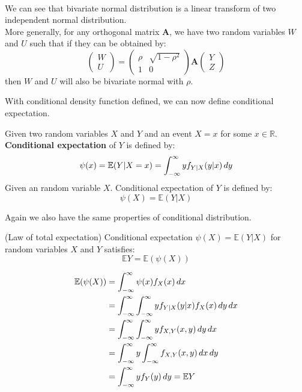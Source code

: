 \documentclass{huhtakm-template-book}
\newcommand{\expect}{\mathbb{E}}
\begin{document}
\begin{eg}
\begin{align*}
        \end{align*}
        We can see that bivariate normal distribution is a linear transform of two independent normal distribution.\\
        More generally, for any orthogonal matrix $\mathbf{A}$, we have two random variables $W$ and $U$ such that if they can be obtained by:
        \begin{equation*}
            \begin{pmatrix}
                W\\
                U
            \end{pmatrix}=\begin{pmatrix}
                \rho & \sqrt{1-\rho^{2}}\\
                1 & 0
            \end{pmatrix}\mathbf{A}\begin{pmatrix}
                Y\\
                Z
            \end{pmatrix}
        \end{equation*}
        then $W$ and $U$ will also be bivariate normal with $\rho$.
    \end{eg}
    With conditional density function defined, we can now define conditional expectation.
    \begin{defn}
        Given two random variables $X$ and $Y$ and an event $X=x$ for some $x\in\mathbb{R}$. \textbf{Conditional expectation} of $Y$ is defined by:
        \begin{equation*}
            \psi(x)=\expect(Y|X=x)=\intinfty yf_{Y|X}(y|x)\,dy
        \end{equation*}
        Given an random variable $X$. Conditional expectation of $Y$ is defined by:
        \begin{equation*}
            \psi(X)=\expect(Y|X)
        \end{equation*}
    \end{defn}
    Again we also have the same properties of conditional distribution.
    \begin{lem}(Law of total expectation) 
        Conditional expectation $\psi(X)=\expect(Y|X)$ for random variables $X$ and $Y$ satisfies:
        \begin{equation*}
            \expect Y=\expect(\psi(X))
        \end{equation*}
    \end{lem}
    \begin{proofing}
        \begin{align*}
            \expect(\psi(X))&=\intinfty\psi(x)f_{X}(x)\,dx\\
            &=\intinfty\intinfty yf_{Y|X}(y|x)f_{X}(x)\,dy\,dx\\
            &=\intinfty\intinfty yf_{X,Y}(x,y)\,dy\,dx\\
            &=\intinfty y\intinfty f_{X,Y}(x,y)\,dx\,dy\\
            &=\intinfty yf_{Y}(y)\,dy=\expect Y
        \end{align*}
    \end{proofing}
\end{document}
